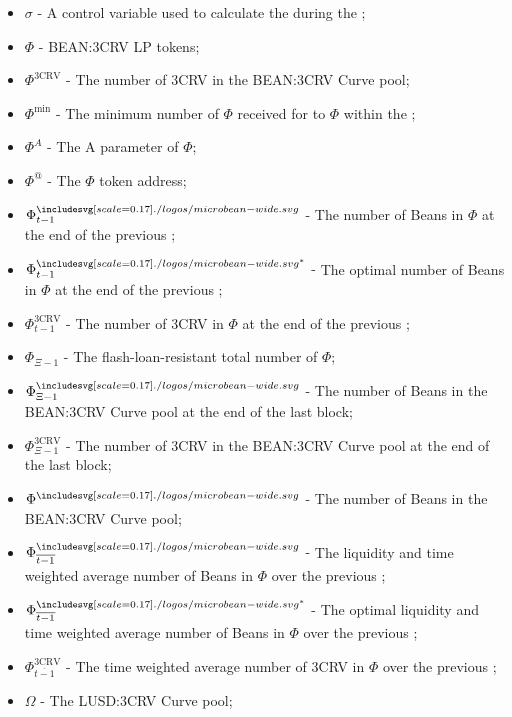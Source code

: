 \documentclass[class=article, crop=false]{standalone}
\begin{document}
\begin{itemize}[topsep=0pt, itemsep=3pt,leftmargin=16pt]
    \item[] $\sigma$ - A control variable used to calculate the  during the ;
    \item[] $\Phi$ - \hypertarget{ht187}{BEAN:3CRV LP tokens};
    \item[] $\Phi^{\text{3CRV}}$ - \hypertarget{ht189}{The number of 3CRV in the BEAN:3CRV Curve pool};
    \item[] $\Phi^{\text{min}}$ - \hypertarget{ht191}{The minimum number of $\Phi$ received for  to  $\Phi$ within the };
    \item[] $\Phi^{A}$ - \hypertarget{ht190}{The A parameter of $\Phi$};
    \item[] $\Phi^{@}$ - The $\Phi$ token address;
    \item[] $\Phi_{t-1}^{\bean}$ - \hypertarget{ht195}{The number of Beans in $\Phi$ at the end of the previous };
    \item[] $\Phi_{t-1}^{{\bean}^*}$ - \hypertarget{ht196}{The optimal number of Beans in $\Phi$ at the end of the previous };
    \item[] $\Phi_{t-1}^{\text{3CRV}}$ - \hypertarget{ht197}{The number of 3CRV in $\Phi$ at the end of the previous };
    \item[] $\Phi_{\Xi-1}$ - \hypertarget{ht192}{The flash-loan-resistant total number of $\Phi$};
    \item[] $\Phi_{\Xi-1}^{\bean}$ - \hypertarget{ht193}{The number of Beans in the BEAN:3CRV Curve pool at the end of the last block};
    \item[] $\Phi_{\Xi-1}^{\text{3CRV}}$ - \hypertarget{ht194}{The number of 3CRV in the BEAN:3CRV Curve pool at the end of the last block};
    \item[] $\Phi^{\bean}$ - \hypertarget{ht188}{The number of Beans in the BEAN:3CRV Curve pool};
    \item[] $\Phi_{\overline{t-1}}^{\bean}$ - \hypertarget{ht198}{The liquidity and time weighted average number of Beans in $\Phi$ over the previous };
    \item[] $\Phi_{\overline{t-1}}^{{\bean}^*}$ - \hypertarget{ht199}{The optimal liquidity and time weighted average number of Beans in $\Phi$ over the previous };
    \item[] $\Phi_{\overline{t-1}}^{\text{3CRV}}$ - \hypertarget{ht200}{The time weighted average number of 3CRV in $\Phi$ over the previous };
    \item[] $\Omega$ - \hypertarget{ht237}{The LUSD:3CRV Curve pool};

\end{itemize}
\end{document}

